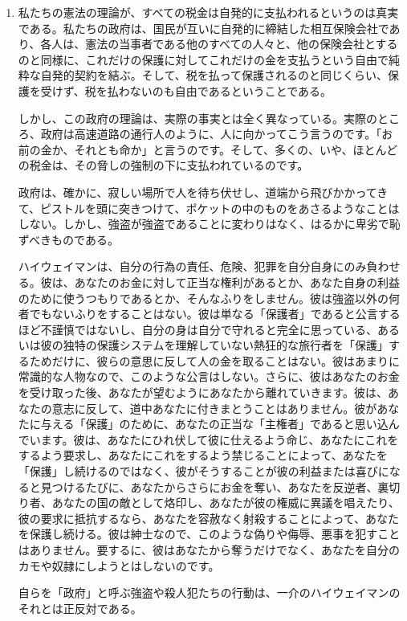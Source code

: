 \documentclass[dvipdfmx, uplatex, tate, landscape]{utbook}
\begin{document}
\begin{enumerate}
  \item 私たちの憲法の理論が、すべての税金は自発的に支払われるというのは真実である。私たちの政府は、国民が互いに自発的に締結した相互保険会社であり、各人は、憲法の当事者である他のすべての人々と、他の保険会社とするのと同様に、これだけの保護に対してこれだけの金を支払うという自由で純粋な自発的契約を結ぶ。そして、税を払って保護されるのと同じくらい、保護を受けず、税を払わないのも自由であるということである。

しかし、この政府の理論は、実際の事実とは全く異なっている。実際のところ、政府は高速道路の通行人のように、人に向かってこう言うのです。「お前の金か、それとも命か」と言うのです。そして、多くの、いや、ほとんどの税金は、その脅しの強制の下に支払われているのです。

政府は、確かに、寂しい場所で人を待ち伏せし、道端から飛びかかってきて、ピストルを頭に突きつけて、ポケットの中のものをあさるようなことはしない。しかし、強盗が強盗であることに変わりはなく、はるかに卑劣で恥ずべきものである。

ハイウェイマンは、自分の行為の責任、危険、犯罪を自分自身にのみ負わせる。彼は、あなたのお金に対して正当な権利があるとか、あなた自身の利益のために使うつもりであるとか、そんなふりをしません。彼は強盗以外の何者でもないふりをすることはない。彼は単なる「保護者」であると公言するほど不謹慎ではないし、自分の身は自分で守れると完全に思っている、あるいは彼の独特の保護システムを理解していない熱狂的な旅行者を「保護」するためだけに、彼らの意思に反して人の金を取ることはない。彼はあまりに常識的な人物なので、このような公言はしない。さらに、彼はあなたのお金を受け取った後、あなたが望むようにあなたから離れていきます。彼は、あなたの意志に反して、道中あなたに付きまとうことはありません。彼があなたに与える「保護」のために、あなたの正当な「主権者」であると思い込んでいます。彼は、あなたにひれ伏して彼に仕えるよう命じ、あなたにこれをするよう要求し、あなたにこれをするよう禁じることによって、あなたを「保護」し続けるのではなく、彼がそうすることが彼の利益または喜びになると見つけるたびに、あなたからさらにお金を奪い、あなたを反逆者、裏切り者、あなたの国の敵として烙印し、あなたが彼の権威に異議を唱えたり、彼の要求に抵抗するなら、あなたを容赦なく射殺することによって、あなたを保護し続ける。彼は紳士なので、このような偽りや侮辱、悪事を犯すことはありません。要するに、彼はあなたから奪うだけでなく、あなたを自分のカモや奴隷にしようとはしないのです。

自らを「政府」と呼ぶ強盗や殺人犯たちの行動は、一介のハイウェイマンのそれとは正反対である。


\end{enumerate}
\end{document}
